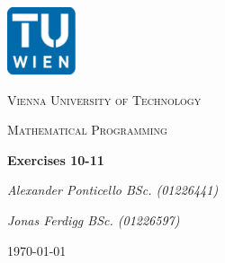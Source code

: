 \begin{titlepage}
	\centering
	\includegraphics[width=0.15\textwidth]{./img/logo_tuwien.png}\par\vspace{1cm}
	{\scshape\LARGE Vienna University of Technology \par}
	\vspace{1cm}
	{\scshape\Large Mathematical Programming \par}
	\vspace{1.5cm}
	{\huge\bfseries Exercises 10-11  \par}
	\vspace{2cm}
	{\Large\itshape Alexander Ponticello BSc. (01226441) \par}
	{\Large\itshape Jonas Ferdigg BSc. (01226597) \par}
	\vfill
	\vspace*{1ex}
	{\large \today\par}
\end{titlepage}

